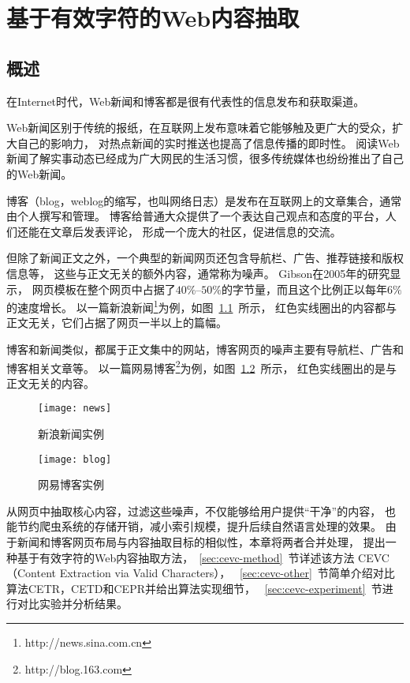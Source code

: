 
\chapter{基于有效字符的Web内容抽取}

\section{概述}
在Internet时代，Web新闻和博客都是很有代表性的信息发布和获取渠道。

Web新闻区别于传统的报纸，在互联网上发布意味着它能够触及更广大的受众，扩大自己的影响力，
对热点新闻的实时推送也提高了信息传播的即时性。
阅读Web新闻了解实事动态已经成为广大网民的生活习惯，很多传统媒体也纷纷推出了自己的Web新闻。

博客（blog，weblog的缩写，也叫网络日志）是发布在互联网上的文章集合，通常由个人撰写和管理。
博客给普通大众提供了一个表达自己观点和态度的平台，人们还能在文章后发表评论，
形成一个庞大的社区，促进信息的交流。

但除了新闻正文之外，一个典型的新闻网页还包含导航栏、广告、推荐链接和版权信息等，
这些与正文无关的额外内容，通常称为噪声。
Gibson在2005年的研究\cite{gibson2005volume}显示，
网页模板在整个网页中占据了$40\%$--$50\%$的字节量，而且这个比例正以每年$6\%$的速度增长。
以一篇新浪新闻\footnote{http://news.sina.com.cn}为例，如图~\ref{fig:news}~所示，
红色实线圈出的内容都与正文无关，它们占据了网页一半以上的篇幅。

博客和新闻类似，都属于正文集中的网站，博客网页的噪声主要有导航栏、广告和博客相关文章等。
以一篇网易博客\footnote{http://blog.163.com}为例，如图~\ref{fig:blog}~所示，
红色实线圈出的是与正文无关的内容。

\begin{figure}[htbp]
\centering
\texttt{[image: news]}
\caption{新浪新闻实例}
\label{fig:news}
\end{figure}

\begin{figure}[htbp]
\centering
\texttt{[image: blog]}
\caption{网易博客实例}
\label{fig:blog}
\end{figure}

从网页中抽取核心内容，过滤这些噪声，不仅能够给用户提供“干净”的内容，
也能节约爬虫系统的存储开销，减小索引规模，提升后续自然语言处理的效果。
由于新闻和博客网页布局与内容抽取目标的相似性，本章将两者合并处理，
提出一种基于有效字符的Web内容抽取方法，~\ref{sec:cevc-method}~节详述该方法
CEVC（Content Extraction via Valid Characters），
~\ref{sec:cevc-other}~节简单介绍对比算法CETR，CETD和CEPR并给出算法实现细节，
~\ref{sec:cevc-experiment}~节进行对比实验并分析结果。


